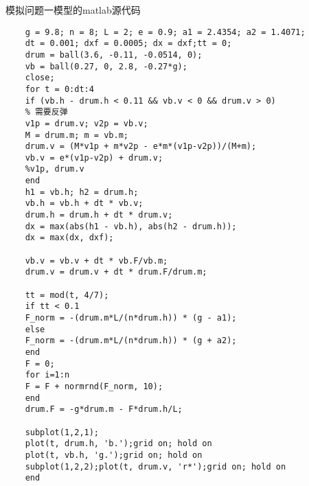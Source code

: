 \documentclass[withoutpreface,bwprint]{cumcmthesis} %
\begin{document}
模拟问题一模型的matlab源代码

\begin{lstlisting}
	g = 9.8; n = 8; L = 2; e = 0.9; a1 = 2.4354; a2 = 1.4071;
	dt = 0.001; dxf = 0.0005; dx = dxf;tt = 0;
	drum = ball(3.6, -0.11, -0.0514, 0);
	vb = ball(0.27, 0, 2.8, -0.27*g);
	close;
	for t = 0:dt:4
	if (vb.h - drum.h < 0.11 && vb.v < 0 && drum.v > 0) 
	% 需要反弹
	v1p = drum.v; v2p = vb.v;
	M = drum.m; m = vb.m;
	drum.v = (M*v1p + m*v2p - e*m*(v1p-v2p))/(M+m);
	vb.v = e*(v1p-v2p) + drum.v;
	%v1p, drum.v
	end
	h1 = vb.h; h2 = drum.h;
	vb.h = vb.h + dt * vb.v;
	drum.h = drum.h + dt * drum.v;
	dx = max(abs(h1 - vb.h), abs(h2 - drum.h));
	dx = max(dx, dxf);
	
	vb.v = vb.v + dt * vb.F/vb.m;
	drum.v = drum.v + dt * drum.F/drum.m;
	
	tt = mod(t, 4/7);
	if tt < 0.1
	F_norm = -(drum.m*L/(n*drum.h)) * (g - a1);
	else
	F_norm = -(drum.m*L/(n*drum.h)) * (g + a2);
	end
	F = 0;
	for i=1:n
	F = F + normrnd(F_norm, 10);
	end
	drum.F = -g*drum.m - F*drum.h/L;
	
	subplot(1,2,1);
	plot(t, drum.h, 'b.');grid on; hold on
	plot(t, vb.h, 'g.');grid on; hold on
	subplot(1,2,2);plot(t, drum.v, 'r*');grid on; hold on
	end

\end{lstlisting}
\end{document}
